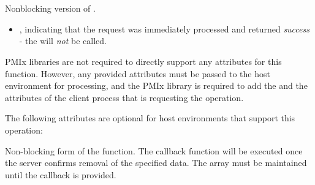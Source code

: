 \section{}

\summary

Nonblocking version of .

\format


\begin{arglist}
\end{arglist}

\returnsimplenb

\returnstart
\begin{itemize}
    \item {}, indicating that the request was immediately processed and returned \textit{success} - the  will \textit{not} be called.
\end{itemize}
\returnend

\reqattrstart
\ac{PMIx} libraries are not required to directly support any attributes for this function. However, any provided attributes must be passed to the host environment for processing, and the \ac{PMIx} library is required to add the  and the  attributes of the client process that is requesting the operation.

\reqattrend

\optattrstart
The following attributes are optional for host environments that support this operation:


\optattrend

\descr

Non-blocking form of the  function.
The callback function will be executed once the server confirms removal of the specified data. The  array must be maintained until the callback is provided.


